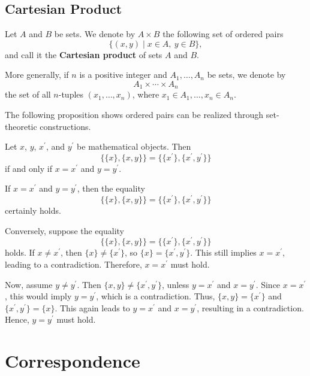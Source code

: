 \documentclass{book}
\numberwithin{equation}{section}
\begin{document}
\section{Cartesian Product}

\begin{definitionenv}
Let \(A\) and \(B\) be sets. We denote by \(A \times B\) the following set of ordered pairs
\[
\{(x, y) \mid x \in A,\ y \in B\},
\]
and call it the \textbf{Cartesian product} of sets \(A\) and \(B\).

More generally, if \(n\) is a positive integer and \(A_1, \ldots, A_n\) be sets, we denote by
\[
A_1 \times \cdots \times A_n
\]
the set of all \(n\)-tuples \((x_1, \ldots, x_n)\), where \(x_1 \in A_1, \ldots, x_n \in A_n\).
\end{definitionenv}

The following proposition shows ordered pairs can be realized through set-theoretic constructions.

\begin{propositionenv}
Let \(x\), \(y\), \(x^{\prime}\), and \(y^{\prime}\) be mathematical objects. Then
\[
\{\{x\},\{x,y\}\}=\{\{x^{\prime}\},\{x^{\prime},y^{\prime}\}\}
\]
if and only if \(x=x^{\prime}\) and \(y=y^{\prime}\).
\end{propositionenv}

\begin{proofenv}
If \(x=x^{\prime}\) and \(y=y^{\prime}\), then the equality
\[
\{\{x\},\{x,y\}\}=\{\{x^{\prime}\},\{x^{\prime},y^{\prime}\}\}
\]
certainly holds.

Conversely, suppose the equality
\[
\{\{x\},\{x,y\}\}=\{\{x^{\prime}\},\{x^{\prime},y^{\prime}\}\}
\]
holds. If \(x\neq x^{\prime}\), then \(\{x\}\neq\{x^{\prime}\}\), so \(\{x\}=\{x^{\prime},y^{\prime}\}\). This still implies \(x=x^{\prime}\), leading to a contradiction. Therefore, \(x=x^{\prime}\) must hold.

Now, assume \(y\neq y^{\prime}\). Then \(\{x,y\}\neq\{x^{\prime},y^{\prime}\}\), unless \(y=x^{\prime}\) and \(x=y^{\prime}\). Since \(x=x^{\prime}\), this would imply \(y=y^{\prime}\), which is a contradiction. Thus, \(\{x,y\}=\{x^{\prime}\}\) and \(\{x^{\prime},y^{\prime}\}=\{x\}\). This again leads to \(y=x^{\prime}\) and \(x=y^{\prime}\), resulting in a contradiction. Hence, \(y=y^{\prime}\) must hold.
\end{proofenv}

\chapter{Correspondence}
\end{document}
